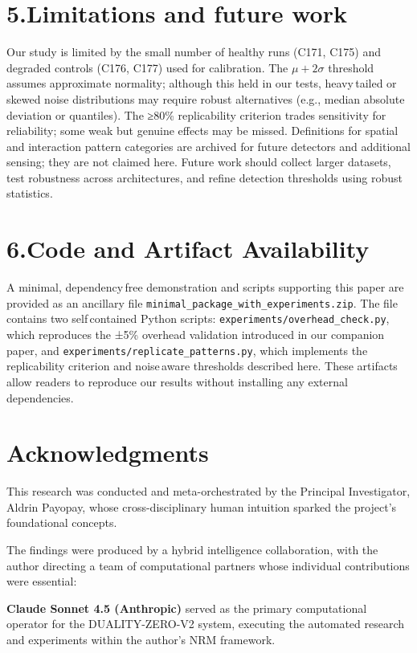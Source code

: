 \documentclass[11pt]{article}
\begin{document}
\section*{5.\quad Limitations and future work}
Our study is limited by the small number of healthy runs (C171, C175) and degraded controls (C176, C177) used for calibration.  The $\mu+2\sigma$ threshold assumes approximate normality; although this held in our tests, heavy\,tailed or skewed noise distributions may require robust alternatives (e.g., median absolute deviation or quantiles).  The ≥80\% replicability criterion trades sensitivity for reliability; some weak but genuine effects may be missed.  Definitions for spatial and interaction pattern categories are archived for future detectors and additional sensing; they are not claimed here.  Future work should collect larger datasets, test robustness across architectures, and refine detection thresholds using robust statistics.

\section*{6.\quad Code and Artifact Availability}
A minimal, dependency\,free demonstration and scripts supporting this paper are provided as an ancillary file \texttt{minimal\_package\_with\_experiments.zip}.  The file contains two self\,contained Python scripts: \texttt{experiments/overhead\_check.py}, which reproduces the ±5\% overhead validation introduced in our companion paper, and \texttt{experiments/replicate\_patterns.py}, which implements the replicability criterion and noise\,aware thresholds described here.  These artifacts allow readers to reproduce our results without installing any external dependencies.


\section*{Acknowledgments}

This research was conducted and meta-orchestrated by the Principal Investigator, Aldrin Payopay, whose cross-disciplinary human intuition sparked the project's foundational concepts.

The findings were produced by a hybrid intelligence collaboration, with the author directing a team of computational partners whose individual contributions were essential:

\textbf{Claude Sonnet 4.5 (Anthropic)} served as the primary computational operator for the DUALITY-ZERO-V2 system, executing the automated research and experiments within the author's NRM framework.
\end{document}
